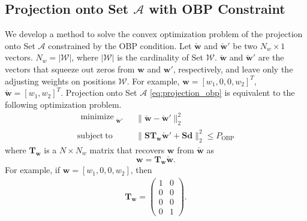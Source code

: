 \documentclass[paper]{ieice}
\begin{document}
\subsection{Projection onto Set $\mathcal{A}$ with OBP Constraint} \label{sec.projection_opb}
We develop a method to solve the convex optimization problem of the projection onto Set $\mathcal{A}$ constrained by the OBP condition.  
Let $\check{\mathbf{w}}$ and $\check{\mathbf{w}}'$ be two $N_w \times 1$ vectors.  $N_w = |\mathcal{W}|$, where $|\mathcal{W}|$ is the cardinality of Set $\mathcal{W}$. $\check{\mathbf{w}}$ and $\check{\mathbf{w}}'$ are the vectors that squeeze out zeros from $\mathbf{w}$ and $\mathbf{w}'$, respectively, and leave only the adjusting weights on positions $\mathcal{W}$.  For example, $\mathbf{w} = [w_1,0,0,w_2]^T$, $\check{\mathbf{w}} = [w_1,w_2]^T$. Projection onto Set $\mathcal{A}$ \eqref{eq:projection_obp} is equivalent to the following optimization problem.
\begin{equation} \label{eq:proj_A}
\begin{array}{ll}
\begin{split}
\mathop{\text{minimize}}_{\substack{\check{\mathbf{w}}'}} 
\end{split}  
& \|\check{\mathbf{w}}-\check{\mathbf{w}}'\|_2^2\\
\mathrm{subject~to} & \|\mathbf{S}\mathbf{T}_{\mathbf{w}}\check{\mathbf{w}}'+\mathbf{S}\mathbf{d}\|_2^2 \leq P_{\mathrm{OBP}}
\end{array}
\end{equation}
where $\mathbf{T}_{\mathbf{w}}$ is a $N \times N_{w}$ matrix that recovers $\mathbf{w}$ from $\check{\mathbf{w}}$ as
\begin{equation}
\mathbf{w} = \mathbf{T}_{\mathbf{w}}\check{\mathbf{w}}.
\end{equation}
For example, if $\mathbf{w} = [w_1,0,0,w_2]$, then 
\begin{eqnarray}
\mathbf{T}_{\mathbf{w}} = 
\begin{pmatrix}
1 & 0     \\
0 & 0     \\
0 & 0      \\
0 & 1
\end{pmatrix}\nonumber.
\end{eqnarray}
\end{document}
